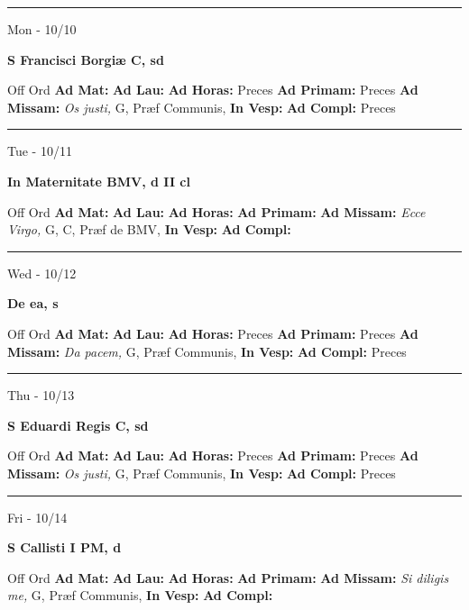 \documentclass[letterpaper, 10pt]{article}
\begin{document}
\hrule
\begin{center}
Mon - 10/10
\end{center}\textbf{ \large S Francisci Borgiæ C, \textnormal{\normalsize sd}}
\begin{justify}
Off Ord
\textbf{Ad Mat: }
\textbf{Ad Lau: }
\textbf{Ad Horas: }Preces
\textbf{Ad Primam: }Preces
\textbf{Ad Missam:} \textit{Os justi, } G, Præf Communis, 
\textbf{In Vesp: }
\textbf{Ad Compl: }Preces\end{justify}



\hrule
\begin{center}
Tue - 10/11
\end{center}\textbf{ \large In Maternitate BMV, \textnormal{\normalsize d II cl}}
\begin{justify}
Off Ord
\textbf{Ad Mat: }
\textbf{Ad Lau: }
\textbf{Ad Horas: }
\textbf{Ad Primam: }
\textbf{Ad Missam:} \textit{Ecce Virgo, } G, C, Præf de BMV, 
\textbf{In Vesp: }
\textbf{Ad Compl: }\end{justify}



\hrule
\begin{center}
Wed - 10/12
\end{center}\textbf{ \large De ea, \textnormal{\normalsize s}}
\begin{justify}
Off Ord
\textbf{Ad Mat: }
\textbf{Ad Lau: }
\textbf{Ad Horas: }Preces
\textbf{Ad Primam: }Preces
\textbf{Ad Missam:} \textit{Da pacem, } G, Præf Communis, 
\textbf{In Vesp: }
\textbf{Ad Compl: }Preces\end{justify}



\hrule
\begin{center}
Thu - 10/13
\end{center}\textbf{ \large S Eduardi Regis C, \textnormal{\normalsize sd}}
\begin{justify}
Off Ord
\textbf{Ad Mat: }
\textbf{Ad Lau: }
\textbf{Ad Horas: }Preces
\textbf{Ad Primam: }Preces
\textbf{Ad Missam:} \textit{Os justi, } G, Præf Communis, 
\textbf{In Vesp: }
\textbf{Ad Compl: }Preces\end{justify}



\hrule
\begin{center}
Fri - 10/14
\end{center}\textbf{ \large S Callisti I PM, \textnormal{\normalsize d}}
\begin{justify}
Off Ord
\textbf{Ad Mat: }
\textbf{Ad Lau: }
\textbf{Ad Horas: }
\textbf{Ad Primam: }
\textbf{Ad Missam:} \textit{Si diligis me, } G, Præf Communis, 
\textbf{In Vesp: }
\textbf{Ad Compl: }\end{justify}
\end{document}
